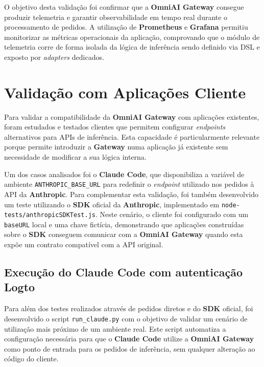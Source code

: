     O objetivo desta validação foi confirmar que a \textbf{OmniAI Gateway} consegue produzir telemetria e garantir observabilidade em tempo real durante o processamento de pedidos. A utilização de \textbf{Prometheus} \cite{prometheus_ref} e \textbf{Grafana} \cite{grafana_ref} permitiu monitorizar as métricas operacionais da aplicação, comprovando que o módulo de telemetria corre de forma isolada da lógica de inferência sendo definido via DSL e exposto por \textit{adapters} dedicados.


    \section{Validação com Aplicações Cliente}

    Para validar a compatibilidade da \textbf{OmniAI Gateway} com aplicações existentes, foram estudados e testados clientes que permitem configurar \textit{endpoints} alternativos para APIs de inferência. Esta capacidade é particularmente relevante porque permite introduzir a \textbf{Gateway} numa aplicação já existente sem necessidade de modificar a sua lógica interna.

    Um dos casos analisados foi o \textbf{Claude Code}, que disponibiliza a variável de ambiente \texttt{ANTHROPIC\_BASE\_URL} para redefinir o \textit{endpoint} utilizado nos pedidos à API da \textbf{Anthropic}. Para complementar esta validação, foi também desenvolvido um teste utilizando o \textbf{SDK} oficial da \textbf{Anthropic}, implementado em \texttt{node-tests/anthropicSDKTest.js}. Neste cenário, o cliente foi configurado com um \texttt{baseURL} local e uma chave fictícia, demonstrando que aplicações construídas sobre o \textbf{SDK} conseguem comunicar com a \textbf{OmniAI Gateway} quando esta expõe um contrato compatível com a API original.

    \subsection{Execução do \textbf{Claude Code} com autenticação \textbf{Logto}}

    Para além dos testes realizados através de pedidos diretos e do \textbf{SDK} oficial, foi desenvolvido o script \texttt{run\_claude.py} com o objetivo de validar um cenário de utilização mais próximo de um ambiente real. Este script automatiza a configuração necessária para que o \textbf{Claude Code} utilize a \textbf{OmniAI Gateway} como ponto de entrada para os pedidos de inferência, sem qualquer alteração ao código do cliente.

